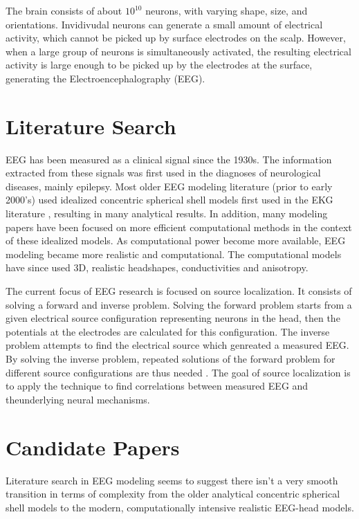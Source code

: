 \documentclass{article}
\author{Allen Yin}
\begin{document}
\maketitle
\setlength\parskip{0.1in}

The brain consists of about $10^{10}$ neurons, with varying shape, size, and orientations. Invidivudal neurons can generate a small amount of electrical activity, which cannot be picked up by surface electrodes on the scalp. However, when a large group of neurons is simultaneously activated, the resulting electrical activity is large enough to be picked up by the electrodes at the surface, generating the Electroencephalography (EEG).

\section{Literature Search}
EEG has been measured as a clinical signal since the 1930s. The information extracted from these signals was first used in the diagnoses of neurological diseases, mainly epilepsy. Most older EEG modeling literature (prior to early 2000's) used idealized concentric spherical shell models first used in the EKG literature \cite{EKG}, resulting in many analytical results. In addition, many modeling papers have been focused on more efficient computational methods in the context of these idealized models. As computational power become more available, EEG modeling became more realistic and computational. The computational models have since used 3D, realistic headshapes, conductivities and anisotropy.

The current focus of EEG research is focused on source localization. It consists of solving a forward and inverse problem. Solving the forward problem starts from a given electrical source configuration representing neurons in the head, then the potentials at the electrodes are calculated for this configuration. The inverse problem attempts to find the electrical source which genreated a measured EEG. By solving the inverse problem, repeated solutions of the forward problem for different source configurations are thus needed \cite{HanzReview}. The goal of source localization is to apply the technique to find correlations between measured EEG and theunderlying neural mechanisms.

\section{Candidate Papers}
Literature search in EEG modeling seems to suggest there isn't a very smooth transition in terms of complexity from the older analytical concentric spherical shell models \cite{Schneider}\cite{Fender} to the modern, computationally intensive realistic EEG-head models.
\end{document}
